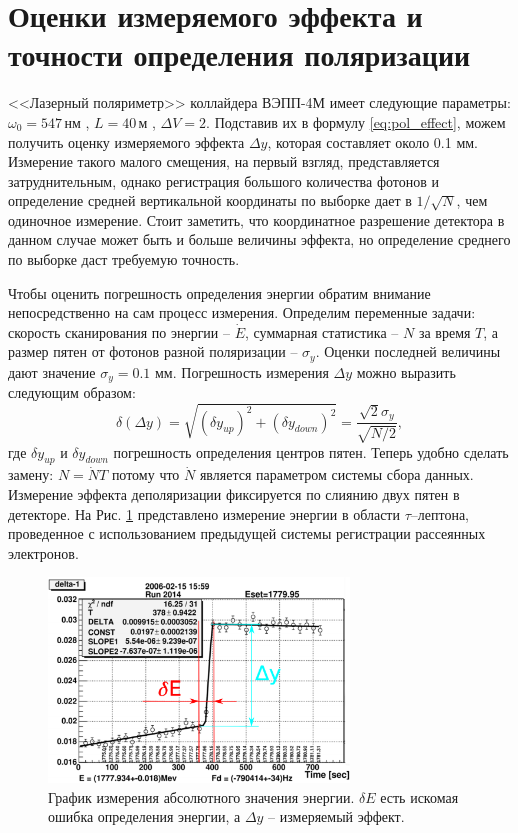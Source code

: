 \section{Оценки измеряемого эффекта и точности определения поляризации }
<<Лазерный поляриметр>> коллайдера ВЭПП-4М имеет следующие параметры: $\omega_0 = 547$\,нм , $L = 40$\,м , $\Delta V = 2$. Подставив их в формулу \ref{eq:pol_effect}, можем получить оценку измеряемого эффекта $\Delta y$, которая составляет около  0.1 мм. Измерение такого малого смещения, на первый взгляд, представляется затруднительным, однако регистрация большого количества фотонов и определение средней вертикальной координаты по выборке дает в $1/\sqrt{N}$, чем одиночное измерение. Стоит заметить, что координатное разрешение детектора в данном случае может быть и больше величины эффекта, но определение среднего по выборке даст требуемую точность. 
\par Чтобы оценить погрешность определения энергии обратим внимание непосредственно на сам процесс измерения. Определим переменные задачи: скорость сканирования по энергии -- $\dot{E}$, суммарная статистика -- $N$ за время $T$, а размер пятен от фотонов разной поляризации -- $\sigma_y$. Оценки последней величины дают значение $\sigma_y = 0.1$ мм. Погрешность измерения $\Delta y$ можно выразить следующим образом: 
\begin{equation}
	\delta(\Delta y) = \sqrt{(\delta y_{up})^2 + (\delta y_{down})^2} = \frac{\sqrt{2} \sigma_y}{\sqrt{N/2}},
\end{equation}
где $\delta y_{up}$ и $\delta y_{down}$ погрешность определения центров пятен.
Теперь удобно сделать замену: $N = \dot{N}T$ потому что $\dot{N}$ является параметром системы сбора данных. Измерение эффекта деполяризации фиксируется по слиянию двух пятен в детекторе. На Рис. \ref{fig:RD_effect_graph} представлено измерение энергии в области $\tau$--лептона, проведенное с использованием предыдущей системы регистрации рассеянных электронов.
\begin{figure}[H]
	\begin{center}
		\includegraphics[width = 8cm]{img/RD_experiment_graph.png}
		\caption{График измерения абсолютного значения энергии. $\delta E$ есть искомая ошибка определения энергии, а $\Delta y$ -- измеряемый эффект.}
		\label{fig:RD_effect_graph}
	\end{center}
\end{figure}
